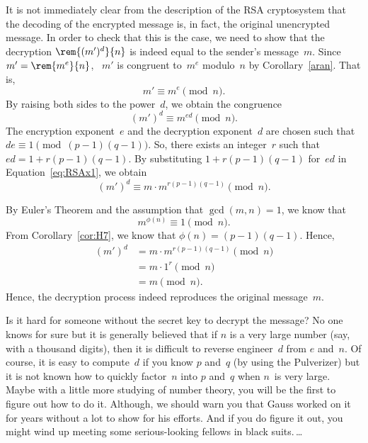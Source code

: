 It is not immediately clear from the description of the RSA
cryptosystem that the decoding of the encrypted message is, in fact,
the original unencrypted message.  In order to check that this is the
case, we need to show that the decryption
$\rem{(m')^d}{n}$ is indeed equal to the sender's message~$m$.  Since
$m' = \rem{m^e}{n}$, \ $m'$ is congruent to~$m^e$ modulo~$n$ by
Corollary~\ref{aran}.  That is,
\begin{equation*}
    m' \equiv m^e \pmod n.
\end{equation*}
By raising both sides to the power~$d$, we obtain the congruence
\begin{equation}\label{eq:RSAx1}
    (m')^d \equiv m^{ed} \pmod n.
\end{equation}
The encryption exponent~$e$ and the decryption exponent~$d$ are chosen
such that $de \equiv 1 \pmod{(p - 1)(q - 1)}$.  So, there exists an
integer~$r$ such that $ed = 1 + r(p - 1)(q - 1)$.  By substituting $1
+ r(p - 1)(q - 1)$ for~$ed$ in Equation~\ref{eq:RSAx1}, we obtain
\begin{equation}\label{eq:RSAx2}
    (m')^d \equiv m \cdot m^{r(p - 1)(q - 1)} \pmod n.
\end{equation}

By Euler's Theorem and the assumption that $\gcd(m, n) = 1$, we know
that
\begin{equation*}
    m^{\phi(n)} \equiv 1 \pmod n.
\end{equation*}
From Corollary~\ref{cor:H7}, we know that $\phi(n) = (p - 1)(q - 1)$.
Hence,
\begin{align*}
(m')^d  &= m \cdot m^{r(p-1)(q-1)} \pmod{n} \\
        &= m \cdot 1^{r} \pmod{n} \\
        &= m \pmod{n}.
\end{align*}
Hence, the decryption process indeed reproduces the original
message~$m$.

Is it hard for someone without the secret key to decrypt the message?
No one knows for sure but it is generally believed that if $n$ is a
very large number (say, with a thousand digits), then it is difficult
to reverse engineer~$d$ from $e$ and~$n$.  Of course, it is easy to
compute~$d$ if you know $p$ and~$q$ (by using the Pulverizer) but it
is not known how to quickly factor~$n$ into $p$ and~$q$ when $n$~is
very large.  Maybe with a little more studying of number theory, you
will be the first to figure out how to do it.  Although, we should
warn you that Gauss worked on it for years without a lot to show for
his efforts.  And if you do figure it out, you might wind up meeting
some serious-looking fellows in black suits.\,\dots


